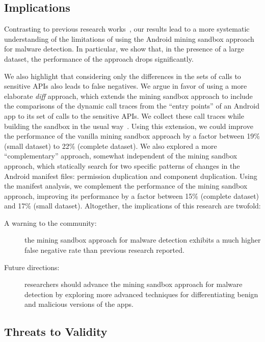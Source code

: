 \subsection{Implications}\label{sec:implications} 

Contrasting to previous research works~\cite{DBLP:conf/wcre/BaoLL18,DBLP:conf/iceccs/LeB0GL18,DBLP:journals/jss/CostaMMSSBNR22},
our results 
lead to a more systematic understanding
of the limitations of using the Android mining sandbox approach
for malware detection. In particular, we show that,
in the presence of a large dataset, the performance of the
approach drops significantly. 

We also highlight that considering only the differences in the
sets of calls to sensitive APIs also leads to false negatives. We
argue in favor of using a more elaborate \emph{diff} approach, which
extends the mining sandbox approach to include the comparisons of
the dynamic call traces from the ``entry points'' of an Android app to its
set of calls to the sensitive APIs. We collect these call traces while
building the sandbox in the usual way~\cite{DBLP:conf/icse/JamrozikSZ16}. Using this extension, we could improve
the performance of the vanilla mining sandbox approach by a factor
between 19\% (small dataset) to 22\% (complete dataset). We
also explored a more ``complementary'' approach, somewhat independent
of the mining sandbox approach, which statically search for two
specific patterns of changes in the Android manifest files: permission
duplication and component duplication. Using the manifest analysis,
we complement the performance of the mining sandbox approach, improving its performance by
a factor between 15\% (complete dataset) and 17\% (small dataset).
Altogether, the implications of this research are twofold:

\begin{description}
  \item[A warning to the community:] the mining sandbox approach for malware detection exhibits a much higher false negative rate  than previous research reported. 
  \item[Future directions:] researchers should advance the mining sandbox approach for malware detection by exploring more advanced techniques for differentiating benign and malicious versions of the apps. 
\end{description}  


\subsection{Threats to Validity}\label{sec:threats}

